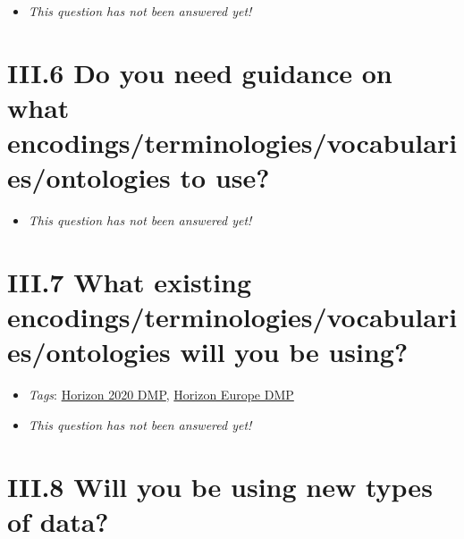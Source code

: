 \documentclass[a4paper,12pt]{report}
\begin{document}
\begin{itemize}
  \item[\XSolidBrush] \textit{This question has not been answered yet!}
\end{itemize}
  




\section*{\protect\textcolor{colorSecId}{III.6} Do you need guidance on what encodings/terminologies/vocabularies/ontologies to use?}

\label{b1df3c74-0b1f-4574-81c4-4cc2d780c1af.510aca7e-2844-4b27-8b89-83d0ed189312}






\begin{itemize}
  \item[\XSolidBrush] \textit{This question has not been answered yet!}
\end{itemize}
  


\section*{\protect\textcolor{colorSecId}{III.7} What existing encodings/terminologies/vocabularies/ontologies will you be using?}

\label{b1df3c74-0b1f-4574-81c4-4cc2d780c1af.2bac9020-99cf-4463-8d34-0b0eb2781cd1}


\begin{itemize}
  \item \textit{Tags}: \ul{Horizon 2020 DMP}, \ul{Horizon Europe DMP}
  \end{itemize}




\begin{itemize}
  \item[\XSolidBrush] \textit{This question has not been answered yet!}
\end{itemize}
  


\section*{\protect\textcolor{colorSecId}{III.8} Will you be using new types of data?}
\end{document}
